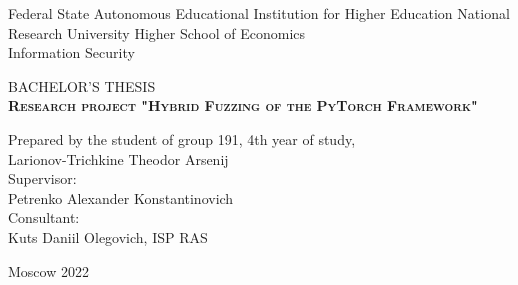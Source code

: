 \begin{titlepage}
    \newpage

    {
        \begin{center}
            Federal State Autonomous Educational Institution for Higher Education
            National Research University Higher School of Economics
            \\
            \bigskip
            Information Security \\
        \end{center}
    }

    \vspace{8em}

    \begin{center}
        {\Large BACHELOR'S THESIS}\\
        \textsc{\textbf{
                Research project
                \linebreak
                "Hybrid Fuzzing of the PyTorch Framework"}}
    \end{center}

    \vspace{4em}

    {
        \hfill\parbox{16cm}{
            \hspace*{5cm}\hspace*{-5cm}Prepared by the student of group 191, 4th year of study,\\
            Larionov-Trichkine Theodor Arsenij\\

            \hspace*{5cm}\hspace*{-5cm}Supervisor:\\
            Petrenko Alexander Konstantinovich
            \\

            \hspace*{5cm}\hspace*{-5cm}Consultant:\\
            Kuts Daniil Olegovich, ISP RAS
            \\
        }
    }

    \vspace{\fill}

    \begin{center}
        Moscow 2022
    \end{center}

\end{titlepage}
